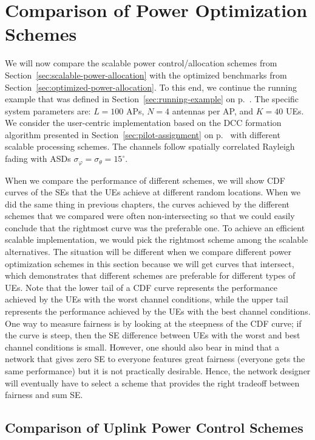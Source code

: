 \section{Comparison of Power Optimization Schemes}
\label{sec:comparison-power-optimzation}

We will now compare the scalable power control/allocation schemes from Section~\ref{sec:scalable-power-allocation} with the optimized benchmarks from Section~\ref{sec:optimized-power-allocation}.
To this end, we continue the running example that was defined in Section~\ref{sec:running-example} on p.~\pageref{sec:running-example}. The specific system parameters are: $L=100$ APs, $N=4$ antennas per AP, and $K=40$ UEs. We consider the user-centric implementation based on the DCC formation algorithm presented in Section~\ref{sec:pilot-assignment} on p.~\pageref{sec:pilot-assignment} with different scalable processing schemes. The channels follow spatially correlated Rayleigh fading with ASDs $\sigma_{\varphi}=\sigma_{\theta}=15^{\circ}$.

When we compare the performance of different schemes, we will show CDF curves of the SEs that the UEs achieve at different random locations. When we did the same thing in previous chapters, the curves achieved by the different schemes that we compared were often non-intersecting so that we could easily conclude that the rightmost curve was the preferable one. 
To achieve an efficient scalable implementation, we would pick the rightmost scheme among the scalable alternatives. The situation will be different when we compare different power optimization schemes in this section because we will get curves that intersect, which demonstrates that different schemes are preferable for different types of UEs. Note that the lower tail of a CDF curve represents the performance achieved by the UEs with the worst channel conditions, while the upper tail represents the performance achieved by the UEs with the best channel conditions. One way to measure fairness is by looking at the steepness of the CDF curve; if the curve is steep, then the SE difference between UEs with the worst and best channel conditions is small. However, one should also bear in mind that a network that gives zero SE to everyone features great fairness (everyone gets the same performance) but it is not practically desirable. Hence, the network designer will eventually have to select a scheme that provides the right tradeoff between fairness and sum SE.


\subsection{Comparison of Uplink Power Control Schemes}

